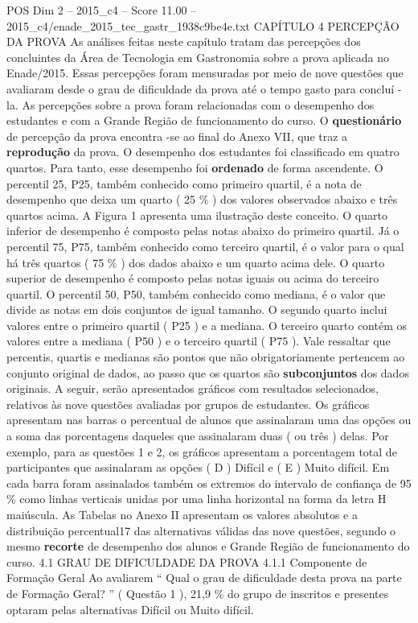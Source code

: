 \begin{textsample}{POS Dim 2 – 2015\_c4 – Score 11.00 – 2015\_c4/enade\_2015\_tec\_gastr\_1938c9be4e.txt}  \label{ex:f2_pos_083}
CAPÍTULO 4 PERCEPÇÃO DA PROVA As análises feitas neste capítulo tratam das percepções dos concluintes da Área de Tecnologia em Gastronomia sobre a prova aplicada no Enade/2015.
Essas percepções foram mensuradas por meio de nove questões que avaliaram desde o grau de dificuldade da prova até o tempo gasto para concluí -la.
As percepções sobre a prova foram relacionadas com o desempenho dos estudantes e com a Grande Região de funcionamento do curso.
O \textbf{questionário} de percepção da prova encontra -se ao final do Anexo VII, que traz a \textbf{reprodução} da prova.
O desempenho dos estudantes foi classificado em quatro quartos.
Para tanto, esse desempenho foi \textbf{ordenado} de forma ascendente.
O percentil 25, P25, também conhecido como primeiro quartil, é a nota de desempenho que deixa um quarto ( 25 \% ) dos valores observados abaixo e três quartos acima.
A Figura 1 apresenta uma ilustração deste conceito.
O quarto inferior de desempenho é composto pelas notas abaixo do primeiro quartil.
Já o percentil 75, P75, também conhecido como terceiro quartil, é o valor para o qual há três quartos ( 75 \% ) dos dados abaixo e um quarto acima dele.
O quarto superior de desempenho é composto pelas notas iguais ou acima do terceiro quartil.
O percentil 50, P50, também conhecido como mediana, é o valor que divide as notas em dois conjuntos de igual tamanho.
O segundo quarto inclui valores entre o primeiro quartil ( P25 ) e a mediana.
O terceiro quarto contém os valores entre a mediana ( P50 ) e o terceiro quartil ( P75 ).
Vale ressaltar que percentis, quartis e medianas são pontos que não obrigatoriamente pertencem ao conjunto original de dados, ao passo que os quartos são \textbf{subconjuntos} dos dados originais.
A seguir, serão apresentados gráficos com resultados selecionados, relativos às nove questões avaliadas por grupos de estudantes.
Os gráficos apresentam nas barras o percentual de alunos que assinalaram uma das opções ou a soma das porcentagens daqueles que assinalaram duas ( ou três ) delas.
Por exemplo, para as questões 1 e 2, os gráficos apresentam a porcentagem total de participantes que assinalaram as opções ( D ) Difícil e ( E ) Muito difícil.
Em cada barra foram assinalados também os extremos do intervalo de confiança de 95 \% como linhas verticais unidas por uma linha horizontal na forma da letra H maiúscula.
As Tabelas no Anexo II apresentam os valores absolutos e a distribuição percentual17 das alternativas válidas das nove questões, segundo o mesmo \textbf{recorte} de desempenho dos alunos e Grande Região de funcionamento do curso. 4.1 GRAU DE DIFICULDADE DA PROVA 4.1.1 Componente de Formação Geral Ao avaliarem “ Qual o grau de dificuldade desta prova na parte de Formação Geral? ” ( Questão 1 ), 21,9 \% do grupo de inscritos e presentes optaram pelas alternativas Difícil ou Muito difícil.

\end{textsample}
